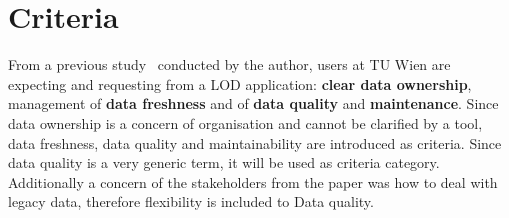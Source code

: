 \chapter{Criteria}

From a previous study~\cite{baronyai_publishing_2016} conducted by the author, users at TU Wien are expecting and requesting from a LOD application: \textbf{clear data ownership}, management of \textbf{data freshness} and of \textbf{data quality} and \textbf{maintenance}. Since data ownership is a concern of organisation and cannot be clarified by a tool, data freshness, data quality and maintainability are introduced as criteria. Since data quality is a very generic term, it will be used as criteria category. Additionally a concern of the stakeholders from the paper was how to deal with legacy data, therefore flexibility is included to Data quality.




